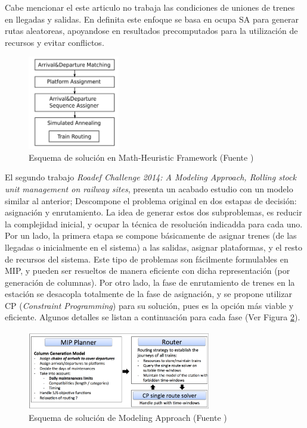\documentclass[letter, 10pt]{article}
\begin{document}
\begin{description}
\begin{enumerate}
	\end{enumerate}
	Cabe mencionar el este articulo no trabaja las condiciones de uniones de trenes en llegadas y salidas. En definita este enfoque se basa en ocupa SA para generar rutas aleatoreas, apoyandose en resultados precomputados para la utilización de recursos y evitar conflictos.
	\begin{figure}[htpb!]
	\centering
	\includegraphics[width=4cm]{diagram}
	\caption{Esquema de solución en Math-Heuristic Framework (Fuente \cite{MathHeuristic})}
	\label{fig:diagram}
	\end{figure}

	El segundo trabajo \textit{Roadef Challenge 2014: A Modeling Approach, Rolling stock unit management on railway sites}\cite{ModelingApproach}, presenta un acabado estudio con un modelo similar al anterior; Descompone el problema original en dos estapas de decisión: asignación y enrutamiento. La idea de generar estos dos subproblemas, es reducir la complejidad inicial, y ocupar la técnica de resolución indicadda para cada uno. Por un lado, la primera etapa se compone básicamente de asignar trenes (de las llegadas o inicialmente en el sistema) a las salidas, asignar plataformas, y el resto de recursos del sistema. Este tipo de problemas son fácilmente formulables en MIP, y pueden ser resueltos de manera eficiente con dicha representación (por generación de columnas). Por otro lado, la fase de enrutamiento de trenes en la estación se desacopla totalmente de la fase de asignación, y se propone utilizar CP (\textit{Constraint Programming}) para su solución, pues es la opción más viable y eficiente. Algunos detalles se listan a continuación para cada fase (Ver Figura \ref{fig:diagram2}).
 	\begin{figure}[htpb!]
	\centering
	\includegraphics[width=8cm]{diagram2}
	\caption{Esquema de solución de Modeling Approach (Fuente \cite{ModelingApproach})}
	\label{fig:diagram2}
	\end{figure}


\end{description}
\end{document}
